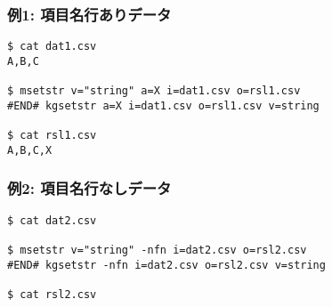
\subsubsection*{例1: 項目名行ありデータ}


\begin{Verbatim}[baselinestretch=0.7,frame=single]
$ cat dat1.csv
A,B,C

$ msetstr v="string" a=X i=dat1.csv o=rsl1.csv
#END# kgsetstr a=X i=dat1.csv o=rsl1.csv v=string

$ cat rsl1.csv
A,B,C,X
\end{Verbatim}

\subsubsection*{例2: 項目名行なしデータ}


\begin{Verbatim}[baselinestretch=0.7,frame=single]
$ cat dat2.csv

$ msetstr v="string" -nfn i=dat2.csv o=rsl2.csv
#END# kgsetstr -nfn i=dat2.csv o=rsl2.csv v=string

$ cat rsl2.csv
\end{Verbatim}

